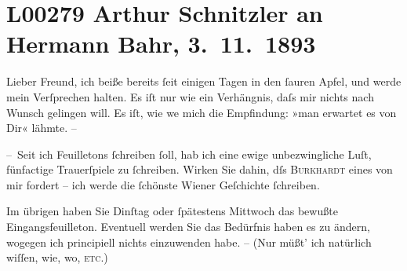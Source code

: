 

\section[Arthur Schnitzler an Hermann Bahr, 3. 11. 1893]{L00279 Arthur Schnitzler an Hermann Bahr, 3. 11. 1893}
\nopagebreak{}
\rehead{ }\normalsize\beginnumbering{}
\toendnotes[C]{\smallbreak\pagebreak[2]}
\toendnotes[C]{\smallbreak}
\pstart{}{\pb}Lieber
                  Freund,\pend\vspace{0.5em}
\pstart
           ich beiße bereits ſeit einigen Tagen in den ſauren Apfel, und werde mein Verſprechen
               halten. Es iſt nur wie ein Verhängnis, daſs mir nichts nach Wunsch gelingen will. Es
               iſt, wie we{\geminationn} mich die Empfindung: »man erwartet es von
               Dir« lähmte. –\pend
           
\pstart
           – Seit ich Feuilletons ſchreiben ſoll, hab ich eine ewige unbezwingliche Luſt,
               fünfactige Trauer{\pb}ſpiele zu ſchreiben. Wirken Sie dahin, dſs \textsc{Burkhardt} eines von mir fordert – ich werde die ſchönste Wiener Geſchichte ſchreiben.\pend
           
\pstart
           Im übrigen haben Sie Dinſtag oder ſpätestens Mittwoch das bewußte Eingangsfeuilleton. Eventuell werden Sie
               das Bedürfnis haben es zu ändern, wogegen ich principiell nichts einzuwenden habe. –
               (Nur müßt’ ich natürlich wiſſen, wie, wo, \textsc{etc.})\pend
           
